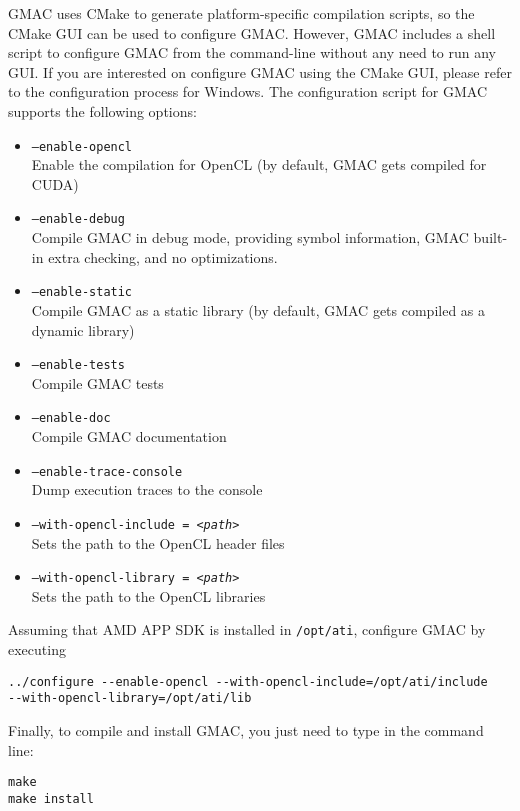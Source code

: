 GMAC uses CMake to generate platform\hyp{}specific compilation scripts, so the CMake GUI can be used 
to configure GMAC\@. However, GMAC includes a shell script to configure GMAC from the 
command\hyp{}line without any need to run any GUI\@. If you are interested on configure GMAC using 
the CMake GUI, please refer to the configuration process for Windows. The configuration script for 
GMAC supports the following options:
\begin{itemize}
\item \texttt{--enable-opencl} \\ Enable the compilation for OpenCL (by default, GMAC gets compiled 
for CUDA)
\item \texttt{--enable-debug} \\ Compile GMAC in debug mode, providing symbol information, GMAC 
built\hyp{}in extra checking, and no optimizations.
\item \texttt{--enable-static} \\ Compile GMAC as a static library (by default, GMAC gets compiled 
as a dynamic library)
\item \texttt{--enable-tests} \\ Compile GMAC tests
\item \texttt{--enable-doc} \\ Compile GMAC documentation
\item \texttt{--enable-trace-console} \\ Dump execution traces to the console
\item \texttt{--with-opencl-include = \emph{<path>}} \\ Sets the path to the OpenCL header files
\item \texttt{--with-opencl-library = \emph{<path>}} \\ Sets the path to the OpenCL libraries
\end{itemize}

Assuming that AMD APP SDK is installed in \texttt{/opt/ati}, configure GMAC by executing
\begin{verbatim}
../configure --enable-opencl --with-opencl-include=/opt/ati/include 
--with-opencl-library=/opt/ati/lib
\end{verbatim}

Finally, to compile and install GMAC, you just need to type in the command line:
\begin{verbatim}
make
make install
\end{verbatim}


